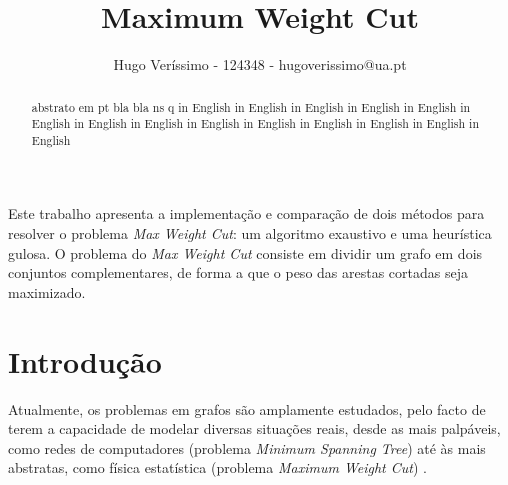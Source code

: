 \documentclass[mirror]{revdetua}
\begin{document}

\title{Maximum Weight Cut}
\author{Hugo Veríssimo - 124348 - hugoverissimo@ua.pt}
\maketitle

\begin{abstract}
abstrato em pt bla bla ns q in English  in English in English in English in English in English in English in English in English in English in English in English in English in English
\end{abstract}

\begin{resumo}
Este trabalho apresenta a implementação e comparação de dois métodos para resolver o problema \textit{Max Weight Cut}: um algoritmo exaustivo e uma heurística gulosa. O problema do \textit{Max Weight Cut} consiste em dividir um grafo em dois conjuntos complementares, de forma a que o peso das arestas cortadas seja maximizado. %
\end{resumo}

\section{Introdução}

Atualmente, os problemas em grafos são amplamente estudados, pelo facto de terem a capacidade de modelar diversas situações reais, desde as mais palpáveis, como redes de computadores (problema \textit{Minimum Spanning Tree}) até às mais abstratas, como física estatística (problema \textit{Maximum Weight Cut}) \cite{WANG10}.
\end{document}
